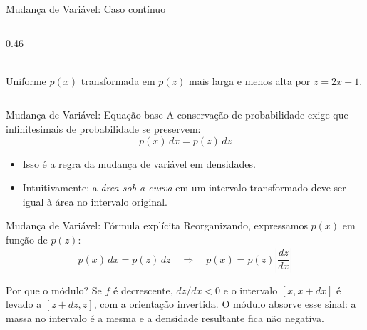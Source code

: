 \documentclass[aspectratio=169,xcolor=dvipsnames]{beamer}
\begin{document}
\begin{frame}{Mudança de Variável: Caso contínuo}
\begin{columns}[T]
\begin{column}{0.46\textwidth}
{%
        }\\
        \tiny Uniforme $p(x)$ transformada em $p(z)$ mais larga e menos
        alta por $z = 2x+1$.
      \end{column}
    \end{columns}
  \end{frame}

  \begin{frame}{Mudança de Variável: Equação base}
    A conservação de probabilidade exige que infinitesimais de
    probabilidade se preservem:
    \vspace{0.6em}
    \[
      p(x)\, dx = p(z)\, dz
    \]
    \vspace{0.2em}
    \begin{itemize}
      \item Isso é a regra da mudança de variável em
      densidades.
      \item Intuitivamente: a \emph{área sob a curva} em um intervalo
      transformado deve ser igual à área no intervalo original.
    \end{itemize}
  \end{frame}

  \begin{frame}{Mudança de Variável: Fórmula explícita}
    Reorganizando, expressamos $p(x)$ em função de $p(z)$:
    \vspace{0.3em}
    \[
      p(x)\, dx = p(z)\, dz
      \quad\Longrightarrow\quad
      p(x) = p(z) \left|\dfrac{dz}{dx}\right|
    \]
    \vspace{0.3em}
    \begin{block}{Por que o módulo?}
      Se $f$ é decrescente, $dz/dx < 0$ e o intervalo $[x, x+dx]$ é levado
      a $[z+dz, z]$, com a orientação invertida. O módulo absorve esse
      sinal: a massa no intervalo é a mesma e a densidade resultante fica
      não negativa.
    \end{block}
  \end{frame}
\end{document}
